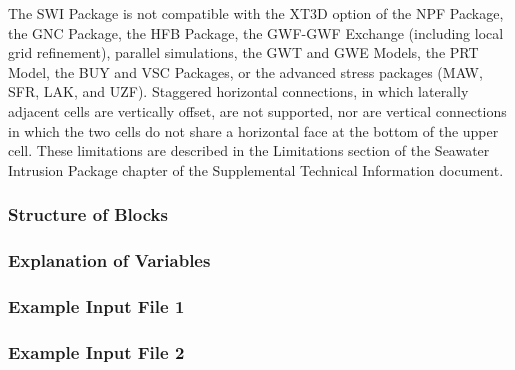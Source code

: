 The SWI Package is not compatible with the XT3D option of the NPF Package, the GNC Package, the HFB Package, the GWF-GWF Exchange (including local grid refinement), parallel simulations, the GWT and GWE Models, the PRT Model, the BUY and VSC Packages, or the advanced stress packages (MAW, SFR, LAK, and UZF).  Staggered horizontal connections, in which laterally adjacent cells are vertically offset, are not supported, nor are vertical connections in which the two cells do not share a horizontal face at the bottom of the upper cell.  These limitations are described in the Limitations section of the Seawater Intrusion Package chapter of the Supplemental Technical Information document.

\vspace{5mm}
\subsubsection{Structure of Blocks}


\vspace{5mm}
\subsubsection{Explanation of Variables}
\begin{description}

\end{description}

\vspace{5mm}
\subsubsection{Example Input File 1}


\vspace{5mm}
\subsubsection{Example Input File 2}

